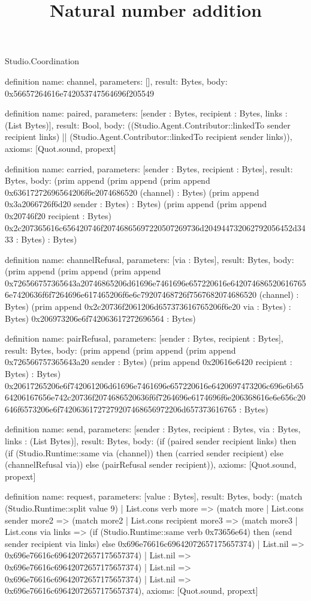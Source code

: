 \begin{lexlean}{Studio.Coordination}
\title{Natural number addition}
\begin{semanticmodule}
definition{
  name: channel,
  parameters: [],
  result: Bytes,
  body: 0x56657264616e742053747564696f205549
}

definition{
  name: paired,
  parameters: [sender : Bytes, recipient : Bytes, links : (List Bytes)],
  result: Bool,
  body: ((Studio.Agent.Contributor::linkedTo sender recipient links) || (Studio.Agent.Contributor::linkedTo recipient sender links)),
  axioms: [Quot.sound, propext]
}

definition{
  name: carried,
  parameters: [sender : Bytes, recipient : Bytes],
  result: Bytes,
  body: (prim append (prim append (prim append 0x63617272696564206f6e2074686520 (channel) : Bytes) (prim append 0x3a2066726f6d20 sender : Bytes) : Bytes) (prim append (prim append 0x20746f20 recipient : Bytes) 0x2c207365616c656420746f20746865697220507269736d204944732062792056452d3433 : Bytes) : Bytes)
}

definition{
  name: channelRefusal,
  parameters: [via : Bytes],
  result: Bytes,
  body: (prim append (prim append (prim append 0x726566757365643a20746865206d61696e7461696e657220616e6420746865206167656e7420636f6f7264696e617465206f6e6c79207468726f7567682074686520 (channel) : Bytes) (prim append 0x2c20736f2061206d657373616765206f6e20 via : Bytes) : Bytes) 0x206973206e6f742063617272696564 : Bytes)
}

definition{
  name: pairRefusal,
  parameters: [sender : Bytes, recipient : Bytes],
  result: Bytes,
  body: (prim append (prim append (prim append 0x726566757365643a20 sender : Bytes) (prim append 0x20616e6420 recipient : Bytes) : Bytes) 0x20617265206e6f742061206d61696e7461696e657220616e6420697473206c696e6b6564206167656e742c20736f2074686520636f6f7264696e6174696f6e206368616e6e656c20646f6573206e6f74206361727279207468656972206d657373616765 : Bytes)
}

definition{
  name: send,
  parameters: [sender : Bytes, recipient : Bytes, via : Bytes, links : (List Bytes)],
  result: Bytes,
  body: (if (paired sender recipient links) then (if (Studio.Runtime::same via (channel)) then (carried sender recipient) else (channelRefusal via)) else (pairRefusal sender recipient)),
  axioms: [Quot.sound, propext]
}

definition{
  name: request,
  parameters: [value : Bytes],
  result: Bytes,
  body: (match (Studio.Runtime::split value 9)
    | List.cons verb more => (match more
      | List.cons sender more2 => (match more2
        | List.cons recipient more3 => (match more3
          | List.cons via links => (if (Studio.Runtime::same verb 0x73656e64) then (send sender recipient via links) else 0x696e76616c69642072657175657374)
          | List.nil => 0x696e76616c69642072657175657374)
        | List.nil => 0x696e76616c69642072657175657374)
      | List.nil => 0x696e76616c69642072657175657374)
    | List.nil => 0x696e76616c69642072657175657374),
  axioms: [Quot.sound, propext]
}


\end{semanticmodule}
\end{lexlean}
